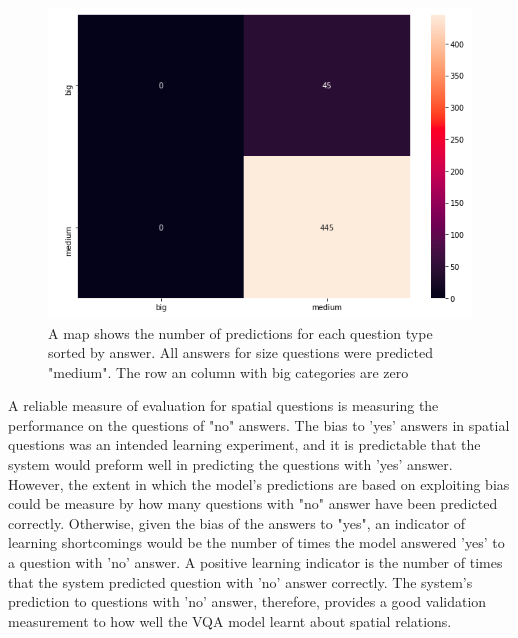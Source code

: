 \begin{figure}[H]
\includegraphics[scale=0.3]{images/heatmapSize.png}
\caption{A map shows the number of predictions for each question type sorted by answer. All answers for size questions were predicted "medium". The row an column with big categories are zero}
\label{fig:heatmapSize}
\end{figure}



A reliable measure of evaluation for spatial questions is measuring the performance on the questions of "no" answers. The bias to 'yes' answers  in spatial questions was an intended learning experiment, and it is predictable that the system would preform well in predicting the questions with 'yes' answer. However, the extent in which the model's predictions are  based on exploiting bias could be measure by how many questions with "no" answer have been predicted correctly. Otherwise, given the bias of the answers to "yes", an indicator of learning shortcomings would be the number of times the model answered 'yes' to a question with 'no' answer. A positive learning indicator is the number of times that the system  predicted question with 'no' answer correctly. The system's prediction to questions with 'no' answer, therefore, provides a good validation measurement to how well the VQA model learnt about spatial relations. 



  

